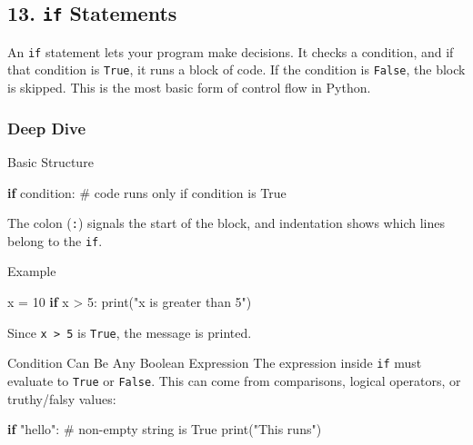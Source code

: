 \documentclass[
  letterpaper,
  DIV=11,
  numbers=noendperiod]{scrreprt}
\newenvironment{Shaded}{\begin{snugshade}}{\end{snugshade}}
\newcommand{\BuiltInTok}[1]{\textcolor[rgb]{0.00,0.23,0.31}{#1}}
\newcommand{\CommentTok}[1]{\textcolor[rgb]{0.37,0.37,0.37}{#1}}
\newcommand{\ControlFlowTok}[1]{\textcolor[rgb]{0.00,0.23,0.31}{\textbf{#1}}}
\newcommand{\DecValTok}[1]{\textcolor[rgb]{0.68,0.00,0.00}{#1}}
\newcommand{\NormalTok}[1]{\textcolor[rgb]{0.00,0.23,0.31}{#1}}
\newcommand{\OperatorTok}[1]{\textcolor[rgb]{0.37,0.37,0.37}{#1}}
\newcommand{\StringTok}[1]{\textcolor[rgb]{0.13,0.47,0.30}{#1}}
\begin{document}
\subsection{\texorpdfstring{13. \texttt{if}
Statements}{13. if Statements}}\label{if-statements}

An \texttt{if} statement lets your program make decisions. It checks a
condition, and if that condition is \texttt{True}, it runs a block of
code. If the condition is \texttt{False}, the block is skipped. This is
the most basic form of control flow in Python.

\subsubsection{Deep Dive}\label{deep-dive-13}

Basic Structure

\begin{Shaded}
\begin{Highlighting}[]
\ControlFlowTok{if}\NormalTok{ condition:}
    \CommentTok{\# code runs only if condition is True}
\end{Highlighting}
\end{Shaded}

The colon (\texttt{:}) signals the start of the block, and indentation
shows which lines belong to the \texttt{if}.

Example

\begin{Shaded}
\begin{Highlighting}[]
\NormalTok{x }\OperatorTok{=} \DecValTok{10}
\ControlFlowTok{if}\NormalTok{ x }\OperatorTok{\textgreater{}} \DecValTok{5}\NormalTok{:}
    \BuiltInTok{print}\NormalTok{(}\StringTok{"x is greater than 5"}\NormalTok{)}
\end{Highlighting}
\end{Shaded}

Since \texttt{x\ \textgreater{}\ 5} is \texttt{True}, the message is
printed.

Condition Can Be Any Boolean Expression The expression inside
\texttt{if} must evaluate to \texttt{True} or \texttt{False}. This can
come from comparisons, logical operators, or truthy/falsy values:

\begin{Shaded}
\begin{Highlighting}[]
\ControlFlowTok{if} \StringTok{"hello"}\NormalTok{:     }\CommentTok{\# non{-}empty string is True}
    \BuiltInTok{print}\NormalTok{(}\StringTok{"This runs"}\NormalTok{)}
\end{Highlighting}
\end{Shaded}
\end{document}
